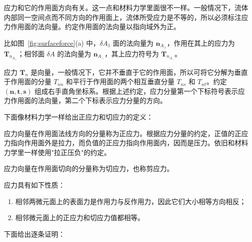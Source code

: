 \begin{warnbox}[注意]
	应力和它的作用面方向有关。这一点和材料力学里面很不一样。一般情况下，流体内部同一空间点而不同方向的作用面上，流体所受应力是不等的，所以必须标注应力作用面的法向量。约定作用面的法向量以指向域外为正。
\end{warnbox}

比如图~\ref{fig:surfaceforce}(a) 中，$\delta A_1$ 面的法向量为 $\boldsymbol{n}_{A_+}$，作用在其上的应力为 $\boldsymbol{T}_{n_{A_+}}$；相邻面 $\delta A$ 的法向量为 $\boldsymbol{n}_{A_-}$，其上应力符号为 $\boldsymbol{T}_{n_{A_-}}$。

应力 $\boldsymbol{T}_n$ 是向量，一般情况下，它并不垂直于它的作用面，所以可将它分解为垂直于作用面的分量 $T_{nn}$ 和平行于作用面的两个相互垂直分量 $T_{ns}$ 和 $T_{nt}$。约定 $(\boldsymbol{n},\boldsymbol{t},\boldsymbol{s})$ 组成右手直角坐标系。根据上述约定，应力分量第一个下标符号表示应力作用面的法向量，第二个下标表示应力分量的方向。

下面像材料力学一样给出正应力和切应力的定义：

\begin{definition}[正应力]
	应力向量在作用面法线方向的分量称为正应力。根据应力分量的约定，正值的正应力指向作用面外是拉力，而负值的正应力指向作用面内，因而是压力。依旧和材料力学里一样使用"拉正压负"的约定。
\end{definition}

\begin{definition}[切应力]
	应力向量在作用面切向的分量称为切应力，也称剪应力。
\end{definition}

\begin{property}[应力的性质]
	应力具有如下性质：
	\begin{enumerate}
		\item 相邻两微元面上的表面力是作用力与反作用力，因此它们大小相等方向相反；
		\item 相邻微元面上的正应力和切应力值都相等。
	\end{enumerate}
\end{property}

下面给出逐条证明：

